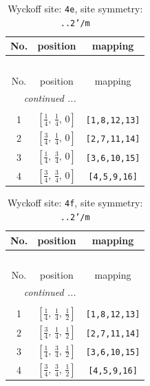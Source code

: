\documentclass[fleqn,8pt]{jsarticle}
\begin{document}
\begin{longtable}{ccc}
\caption{Wyckoff site: {\tt 4e}, site symmetry: {\tt ..2'/m}}
 \\
 \hline \hline
No. & position & mapping \\ \hline \endfirsthead

\multicolumn{2}{l}{\tablename\ \thetable{}} \\
 \hline \hline
No. & position & mapping \\ \hline \endhead

 \hline \hline
\multicolumn{2}{r}{\footnotesize\it continued ...} \\ \endfoot

 \hline \hline
\multicolumn{2}{r}{} \\ \endlastfoot

1 & $\left[ \frac{1}{4},\, \frac{1}{4},\, 0 \right]$ & {\tt [1,8,12,13]} \\ \hline
2 & $\left[ \frac{3}{4},\, \frac{1}{4},\, 0 \right]$ & {\tt [2,7,11,14]} \\ \hline
3 & $\left[ \frac{1}{4},\, \frac{3}{4},\, 0 \right]$ & {\tt [3,6,10,15]} \\ \hline
4 & $\left[ \frac{3}{4},\, \frac{3}{4},\, 0 \right]$ & {\tt [4,5,9,16]} \\
\end{longtable}
\renewcommand{\arraystretch}{1.2}
\begin{longtable}{ccc}
\caption{Wyckoff site: {\tt 4f}, site symmetry: {\tt ..2'/m}}
 \\
 \hline \hline
No. & position & mapping \\ \hline \endfirsthead

\multicolumn{2}{l}{\tablename\ \thetable{}} \\
 \hline \hline
No. & position & mapping \\ \hline \endhead

 \hline \hline
\multicolumn{2}{r}{\footnotesize\it continued ...} \\ \endfoot

 \hline \hline
\multicolumn{2}{r}{} \\ \endlastfoot

1 & $\left[ \frac{1}{4},\, \frac{1}{4},\, \frac{1}{2} \right]$ & {\tt [1,8,12,13]} \\ \hline
2 & $\left[ \frac{3}{4},\, \frac{1}{4},\, \frac{1}{2} \right]$ & {\tt [2,7,11,14]} \\ \hline
3 & $\left[ \frac{1}{4},\, \frac{3}{4},\, \frac{1}{2} \right]$ & {\tt [3,6,10,15]} \\ \hline
4 & $\left[ \frac{3}{4},\, \frac{3}{4},\, \frac{1}{2} \right]$ & {\tt [4,5,9,16]} \\
\end{longtable}
\end{document}
